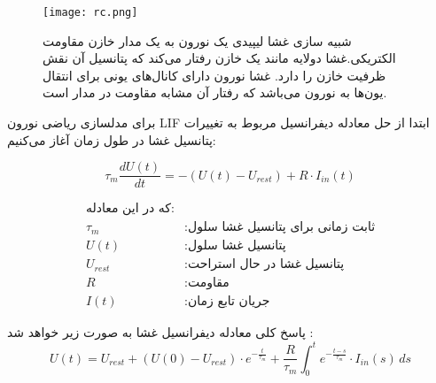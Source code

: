 \begin{figure}[htbp]
	\centering
	\texttt{[image: rc.png]}
	\captionsetup{font=small} %
	\caption{ شبیه سازی غشا لیپیدی یک نورون به یک مدار خازن مقاومت الکتریکی.غشا دولایه مانند یک خازن رفتار می‌کند که پتانسیل آن نقش ظرفیت خازن را دارد. غشا نورون دارای کانال‌های یونی برای انتقال یون‌ها به نورون می‌باشد که رفتار آن مشابه مقاومت در مدار است.}
	\label{fig:neuron7}
\end{figure}

برای مدلسازی ریاضی نورون LIF ابتدا از حل معادله دیفرانسیل مربوط به تغییرات پتانسیل غشا در طول زمان آغاز می‌کنیم:



\begin{equation}
	\tau_m \frac{{dU(t)}}{{dt}} = -(U(t) - U_{rest}) + R \cdot I_{in}(t)
\end{equation}

\begin{align}
	\text{که در این معادله:} \nonumber \\
	\tau_m &: \text{ثابت زمانی برای پتانسیل غشا سلول} \nonumber \\
	U(t) &: \text{پتانسیل غشا سلول} \nonumber \\
	U_{rest} &: \text{پتانسیل غشا در حال استراحت} \nonumber \\
	R &: \text{مقاومت} \nonumber \\
	I(t) &: \text{جریان تابع زمان} \nonumber
\end{align}


 پاسخ کلی معادله دیفرانسیل غشا به صورت زیر خواهد شد :
 \begin{equation}
U(t) = U_{rest} + (U(0) - U_{rest}) \cdot e^{-\frac{t}{\tau_m}} + \frac{R}{\tau_m} \int_{0}^{t} e^{-\frac{t - s}{\tau_m}} \cdot I_{in}(s) \, ds
 \end{equation}
 
 
 
 
% 
 
